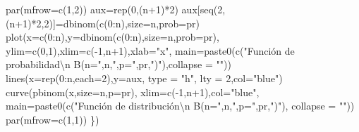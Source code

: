 \documentclass[
  letterpaper,
  DIV=11,
  numbers=noendperiod]{scrreprt}
\newenvironment{Shaded}{\begin{snugshade}}{\end{snugshade}}
\newcommand{\AttributeTok}[1]{\textcolor[rgb]{0.40,0.45,0.13}{#1}}
\newcommand{\DecValTok}[1]{\textcolor[rgb]{0.68,0.00,0.00}{#1}}
\newcommand{\FunctionTok}[1]{\textcolor[rgb]{0.28,0.35,0.67}{#1}}
\newcommand{\NormalTok}[1]{\textcolor[rgb]{0.00,0.23,0.31}{#1}}
\newcommand{\OtherTok}[1]{\textcolor[rgb]{0.00,0.23,0.31}{#1}}
\newcommand{\SpecialCharTok}[1]{\textcolor[rgb]{0.37,0.37,0.37}{#1}}
\newcommand{\StringTok}[1]{\textcolor[rgb]{0.13,0.47,0.30}{#1}}
\begin{document}
\begin{Shaded}
\begin{Highlighting}[]
  \FunctionTok{par}\NormalTok{(}\AttributeTok{mfrow=}\FunctionTok{c}\NormalTok{(}\DecValTok{1}\NormalTok{,}\DecValTok{2}\NormalTok{))}
\NormalTok{  aux}\OtherTok{=}\FunctionTok{rep}\NormalTok{(}\DecValTok{0}\NormalTok{,(n}\SpecialCharTok{+}\DecValTok{1}\NormalTok{)}\SpecialCharTok{*}\DecValTok{2}\NormalTok{)}
\NormalTok{  aux[}\FunctionTok{seq}\NormalTok{(}\DecValTok{2}\NormalTok{,(n}\SpecialCharTok{+}\DecValTok{1}\NormalTok{)}\SpecialCharTok{*}\DecValTok{2}\NormalTok{,}\DecValTok{2}\NormalTok{)]}\OtherTok{=}\FunctionTok{dbinom}\NormalTok{(}\FunctionTok{c}\NormalTok{(}\DecValTok{0}\SpecialCharTok{:}\NormalTok{n),}\AttributeTok{size=}\NormalTok{n,}\AttributeTok{prob=}\NormalTok{pr)}
  \FunctionTok{plot}\NormalTok{(}\AttributeTok{x=}\FunctionTok{c}\NormalTok{(}\DecValTok{0}\SpecialCharTok{:}\NormalTok{n),}\AttributeTok{y=}\FunctionTok{dbinom}\NormalTok{(}\FunctionTok{c}\NormalTok{(}\DecValTok{0}\SpecialCharTok{:}\NormalTok{n),}\AttributeTok{size=}\NormalTok{n,}\AttributeTok{prob=}\NormalTok{pr),}
       \AttributeTok{ylim=}\FunctionTok{c}\NormalTok{(}\DecValTok{0}\NormalTok{,}\DecValTok{1}\NormalTok{),}\AttributeTok{xlim=}\FunctionTok{c}\NormalTok{(}\SpecialCharTok{{-}}\DecValTok{1}\NormalTok{,n}\SpecialCharTok{+}\DecValTok{1}\NormalTok{),}\AttributeTok{xlab=}\StringTok{"x"}\NormalTok{,}
       \AttributeTok{main=}\FunctionTok{paste0}\NormalTok{(}\FunctionTok{c}\NormalTok{(}\StringTok{"Función de probabilidad}\SpecialCharTok{\textbackslash{}n}\StringTok{ B(n="}\NormalTok{,n,}\StringTok{",p="}\NormalTok{,pr,}\StringTok{")"}\NormalTok{),}\AttributeTok{collapse =} \StringTok{""}\NormalTok{))}
  \FunctionTok{lines}\NormalTok{(}\AttributeTok{x=}\FunctionTok{rep}\NormalTok{(}\DecValTok{0}\SpecialCharTok{:}\NormalTok{n,}\AttributeTok{each=}\DecValTok{2}\NormalTok{),}\AttributeTok{y=}\NormalTok{aux, }\AttributeTok{type =} \StringTok{"h"}\NormalTok{, }\AttributeTok{lty =} \DecValTok{2}\NormalTok{,}\AttributeTok{col=}\StringTok{"blue"}\NormalTok{)}
  \FunctionTok{curve}\NormalTok{(}\FunctionTok{pbinom}\NormalTok{(x,}\AttributeTok{size=}\NormalTok{n,}\AttributeTok{p=}\NormalTok{pr),}
        \AttributeTok{xlim=}\FunctionTok{c}\NormalTok{(}\SpecialCharTok{{-}}\DecValTok{1}\NormalTok{,n}\SpecialCharTok{+}\DecValTok{1}\NormalTok{),}\AttributeTok{col=}\StringTok{"blue"}\NormalTok{,}
        \AttributeTok{main=}\FunctionTok{paste0}\NormalTok{(}\FunctionTok{c}\NormalTok{(}\StringTok{"Función de distribución}\SpecialCharTok{\textbackslash{}n}\StringTok{ B(n="}\NormalTok{,n,}\StringTok{",p="}\NormalTok{,pr,}\StringTok{")"}\NormalTok{),}
                    \AttributeTok{collapse =} \StringTok{""}\NormalTok{))}
        \FunctionTok{par}\NormalTok{(}\AttributeTok{mfrow=}\FunctionTok{c}\NormalTok{(}\DecValTok{1}\NormalTok{,}\DecValTok{1}\NormalTok{))}
\NormalTok{\})}
\end{Highlighting}
\end{Shaded}
\end{document}
